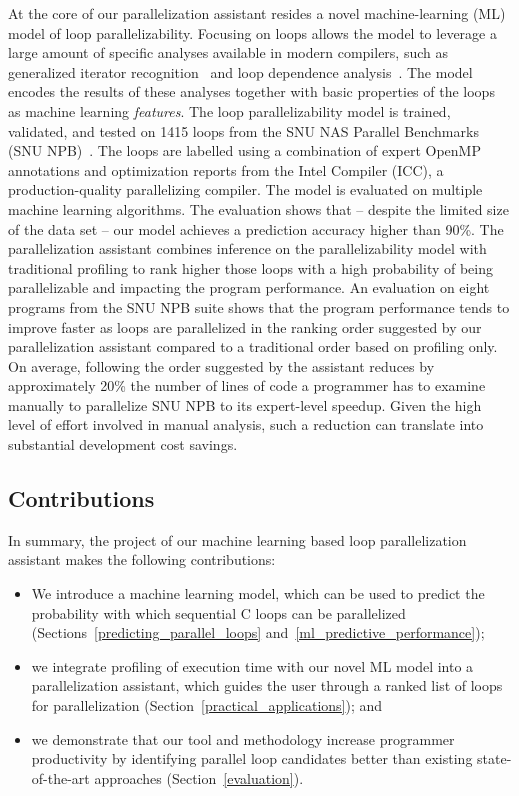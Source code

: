 
At the core of our parallelization assistant resides a novel machine-learning (ML) model of loop parallelizability.
%
Focusing on loops allows the model to leverage a large amount of specific analyses available in modern compilers, such as generalized iterator recognition~\cite{Manilov:2018:GPI:3178372.3179511} and loop dependence analysis~\cite{Jensen:2017:ILD:3132652.3095754}.
%
The model encodes the results of these analyses together with basic properties of the loops as machine learning \textit{features}.
%
The loop parallelizability model is trained, validated, and tested on 1415 loops
from the SNU NAS Parallel Benchmarks (SNU
NPB)~\cite{Seo:2011:PCN:2357490.2358063}.
%
The loops are labelled using a combination of expert OpenMP~\cite{Dagum:1998:OIA:615255.615542}
annotations and optimization reports from the Intel \cpp{} Compiler (ICC), a
production-quality parallelizing compiler.
%
The model is evaluated on multiple machine learning algorithms.
%
The evaluation shows that -- despite the limited size of the data set -- our model achieves a prediction accuracy higher than 90\%.
%
\quad The parallelization assistant combines inference on the parallelizability model
with traditional profiling to rank higher those loops with a high probability of being parallelizable and impacting the program performance.
%
An evaluation on eight programs from the SNU NPB suite shows that
the program performance tends to improve faster as loops are parallelized in the ranking order suggested by our parallelization assistant compared to a traditional order based on profiling only.
%
On average, following the order suggested by the assistant reduces by approximately 20\% the number of lines of code a programmer has to examine manually to parallelize SNU NPB to its expert-level speedup.
%
Given the high level of effort involved in manual analysis, such a reduction
can translate into substantial development cost savings.

\subsection{Contributions}
\quad In summary, the project of our machine learning based loop parallelization assistant makes the following contributions:
%
\begin{itemize}
\renewcommand\labelitemi{$\vartriangleright$}
\renewcommand\labelitemii{$\bullet$}
\item We introduce a machine learning model, which can be used to predict the probability with which sequential C loops can be parallelized (Sections~\ref{predicting_parallel_loops} and~\ref{ml_predictive_performance});
\item we integrate profiling of execution time with our novel ML model into a parallelization assistant, which guides the user through a ranked list of loops for parallelization (Section~\ref{practical_applications}); and
\item we demonstrate that our tool and methodology increase programmer productivity by identifying parallel loop candidates better than existing state-of-the-art approaches (Section~\ref{evaluation}).
\end{itemize}

